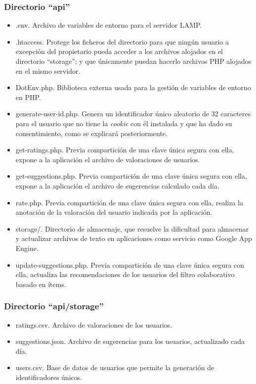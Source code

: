 \subsubsection{Directorio ``api''}

\begin{itemize}
	\item .env. Archivo de variables de entorno para el servidor LAMP.
	\item .htaccess. Protege los ficheros del directorio para que ningún usuario a excepción del propietario pueda acceder a los archivos alojados en el directorio ``storage''; y que únicamente puedan hacerlo archivos PHP alojados en el mismo servidor.
	\item DotEnv.php. Biblioteca externa usada para la gestión de variables de entorno en PHP.
	\item generate-user-id.php. Genera un identificador único aleatorio de 32 caracteres para el usuario que no tiene la \textit{cookie} con él instalada y que ha dado su consentimiento, como se explicará posteriormente. 
	\item get-ratings.php. Previa compartición de una clave única segura con ella, expone a la aplicación el archivo de valoraciones de usuarios.
	\item get-suggestions.php. Previa compartición de una clave única segura con ella, expone a la aplicación el archivo de sugerencias calculado cada día.
	\item rate.php. Previa compartición de una clave única segura con ella, realiza la anotación de la valoración del usuario indicada por la aplicación.
	\item storage/. Directorio de almacenaje, que resuelve la dificultad para almacenar y actualizar archivos de texto en aplicaciones como servicio como Google App Engine.
	\item update-suggestions.php. Previa compartición de una clave única segura con ella, actualiza las recomendaciones de los usuarios del filtro colaborativo basado en ítems. 

\end{itemize}

\subsubsection{Directorio ``api/storage''}

\begin{itemize}
	\item ratings.csv. Archivo de valoraciones de los usuarios.
	\item suggestions.json. Archivo de sugerencias para los usuarios, actualizado cada día.
	\item users.csv. Base de datos de usuarios que permite la generación de identificadores únicos.

\end{itemize}

